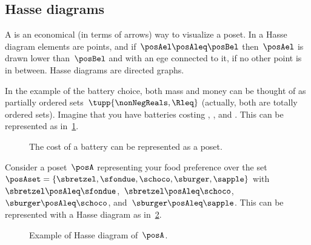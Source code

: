\subsection{Hasse diagrams}

A \emph{} is an economical (in terms of arrows) way to visualize a poset.
In a Hasse diagram elements are points, and if~$\posAel \posAleq \posBel$ then~$\posAel$ is drawn lower than~$\posBel$ and with an ege connected to it, if no other point is in between.
Hasse diagrams are directed graphs.


In the example of the battery choice, both mass and money can be thought of as partially ordered sets~$\tupp{\nonNegReals,\Rleq}$ (actually, both are totally ordered sets).
Imagine that you have batteries costing \unit[10]{\standardcurrency}, \unit[20]{\standardcurrency}, and \unit[30]{\standardcurrency}.
This can be represented as in~\cref{fig:hassebattery}.

\begin{figure}[h!]
	\centering
	\caption{The cost of a battery can be represented as a poset.}
	\label{fig:hassebattery}
\end{figure}


\begin{example}
	Consider a poset~$\posA$ representing your food preference over the set~$\posAset=\{\sbretzel,\sfondue,\schoco,\sburger,\sapple\}$ with~$\sbretzel\posAleq \sfondue$,~$\sbretzel\posAleq \schoco$,~$\sburger\posAleq \schoco$, and~$\sburger\posAleq \sapple$.
	This can be represented with a Hasse diagram as in~\cref{fig:hasse}.
\end{example}

\begin{figure}[h!]
	\centering
	\caption{Example of Hasse diagram of~$\posA$.}
	\label{fig:hasse}
\end{figure}

\begin{marginfigure}
	\centering
	\caption{}
	\label{fig:boolean}
\end{marginfigure}

